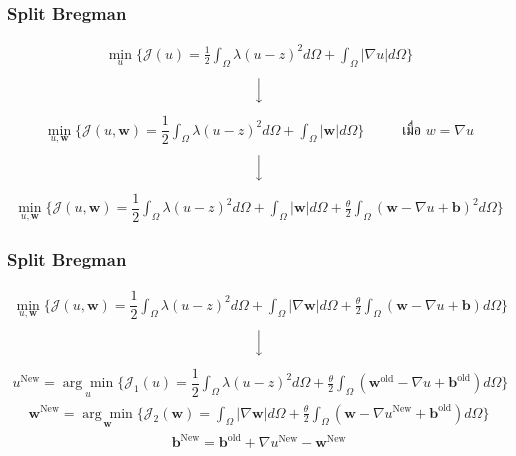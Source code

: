 \documentclass[xcolor=dvipsnames, xetex,serif]{beamer}
\begin{document}
    \begin{frame}
        \frametitle{Split Bregman}
        \begin{align*}
            \min_{u} \{ \mathcal{J}(u) = \frac{1}{2} \int_{\Omega}\lambda (u-z)^2 d\Omega +  \int_{\Omega}  |\nabla u|  d\Omega \}
        \end{align*}
        $$ \Big \downarrow$$
		\begin{align*}
		    \min_{u,\boldsymbol{w}} \{ \mathcal{J}(u,\boldsymbol{w}) = \dfrac{1}{2} \int_{\Omega} \lambda(u-z)^2 d\Omega +  \int_{\Omega}  |\boldsymbol{w}| d\Omega \} \hspace{1cm}\text{ เมื่อ } w = \nabla u
        \end{align*}
        $$ \Big \downarrow$$
		\begin{align*}
		    \min_{u,\boldsymbol{w}} \{ \mathcal{J}(u,\boldsymbol{w}) = \dfrac{1}{2} \int_{\Omega} \lambda(u-z)^2 d\Omega +  \int_{\Omega}  |\boldsymbol{w}|  d\Omega + \frac{\theta}{2} \int_{\Omega} (\boldsymbol{w} - \nabla u + \boldsymbol{b})^2 d\Omega \}
        \end{align*}
        \let\thefootnote\relax{}			
	\end{frame}  	
    \begin{frame}
        \frametitle{Split Bregman}
            \begin{align*}
        \min_{u,\boldsymbol{w}} \{ \mathcal{J}(u,\boldsymbol{w}) = \dfrac{1}{2} \int_{\Omega} \lambda(u-z)^2 d\Omega +  \int_{\Omega}  |\nabla \boldsymbol{w}|  d\Omega + \frac{\theta}{2} \int_{\Omega} (\boldsymbol{w} - \nabla u + \boldsymbol{b}) d\Omega \}
        \end{align*}
        $$ \Big \downarrow$$
        \begin{align*}
        u^{\text{New}}=\underset{u}{\arg\min} \{ \mathcal{J}_1(u) = \dfrac{1}{2} \int_{\Omega} \lambda(u-z)^2 d\Omega + \frac{\theta}{2} \int_{\Omega} (\boldsymbol{w}^{\text{old}} - \nabla u + \boldsymbol{b}^{\text{old}}) d\Omega \}
        \end{align*}
        \begin{align*}
        \boldsymbol{w}^{\text{New}}=\underset{\boldsymbol{w}}{\arg\min} \{ \mathcal{J}_2(\boldsymbol{w}) = \int_{\Omega}  |\nabla \boldsymbol{w}|  d\Omega  + \frac{\theta}{2} \int_{\Omega} (\boldsymbol{w} - \nabla u^{\text{New}} + \boldsymbol{b}^{\text{old}}) d\Omega \}
        \end{align*}
        \begin{align*}
        \boldsymbol{b}^{\text{New}}=\boldsymbol{b}^{\text{old}}+\nabla u^{\text{New}}-\boldsymbol{w}^{\text{New}}
        \end{align*}
    \end{frame}  
\end{document}

